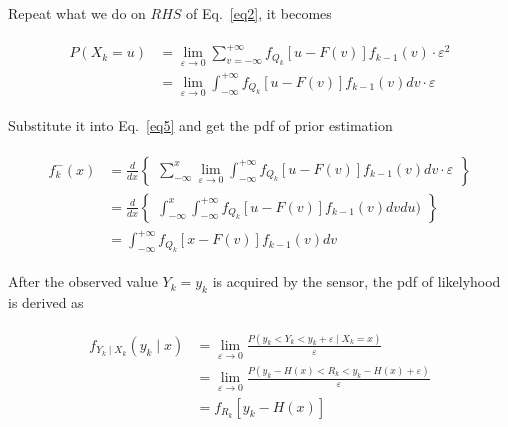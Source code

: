 \documentclass[conference]{IEEEtran}
\begin{document}
	Repeat what we do on $RHS$ of Eq.~\ref{eq2}, it becomes
	
	\begin{equation}
	\begin{split}
	\begin{aligned}
	P(X_{k}=u)&=\lim_{\varepsilon \rightarrow 0 }\sum_{v=-\infty}^{+\infty}f_{Q_{k}}[u-F(v)]f_{k-1}(v)\cdot \varepsilon ^{2}\\
	&=\lim_{\varepsilon \rightarrow 0}\int_{-\infty}^{+\infty}f_{Q_{k}}[u-F(v)]f_{k-1}(v)dv \cdot \varepsilon
	\nonumber
	\end{aligned}
	\end{split}
	\end{equation}
	
	Substitute it into Eq.~\ref{eq5} and get the pdf of prior estimation
	
	\begin{equation}
	\begin{split}
	\begin{aligned}
	f_{k}^{-}(x)&=\frac{d}{dx}\begin{Bmatrix}
	{\sum_{-\infty}^{x}\lim_{\varepsilon \rightarrow 0}\int_{-\infty}^{+\infty}f_{Q_{k}}[u-F(v)]f_{k-1}(v)dv \cdot \varepsilon}
	\end{Bmatrix} \\
	&=\frac{d}{dx}\begin{Bmatrix}
	\int_{-\infty}^{x}\int_{-\infty}^{+\infty}f_{Q_{k}}[u-F(v)]f_{k-1}(v)dvdu)
	\end{Bmatrix}\\
	&=\int_{-\infty}^{+\infty}f_{Q_{k}}[x-F(v)]f_{k-1}(v)dv
	\label{eq6}
	\end{aligned}
	\end{split}
	\end{equation}
	
	After the observed value $Y_{k}=y_{k}$ is acquired by the sensor, the pdf of likelyhood is derived as
	
	\begin{equation}
	\begin{split}
	\begin{aligned}
	f_{Y_{k}\mid X_{k}}(y_{k}\mid x)&=\lim\limits_{\varepsilon \rightarrow 0}\frac{P(y_{k}<Y_{k}<y_{k}+\varepsilon\mid X_{k}=x)}{\varepsilon}\\
	&=\lim_{\varepsilon \rightarrow 0}\frac{P(y_{k}-H(x)<R_{k}<y_{k}-H(x)+\varepsilon)}{\varepsilon}\\
	&=f_{R_{k}}[y_{k}-H(x)]
	\label{eq7}
	\end{aligned}
	\end{split}
	\end{equation}
	
\end{document}
